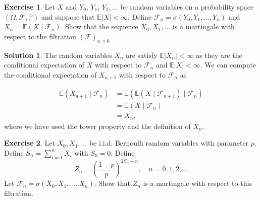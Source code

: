 \documentclass[12pt]{article}
\newcommand{\Prob}{\mathbb{P}}
\newcommand{\calF}{\mathcal{F}}
\newcommand{\abs}[1]{ \left| #1 \right| }
\newcommand{\Expect}{\mathbb{E}}
\theoremstyle{definition}
\newtheorem{exer}{Exercise}
\newtheorem{sol}{Solution}
\theoremstyle{remark}
\begin{document}
\begin{exer}
    Let $X$ and $Y_0$, $Y_1$, $Y_2, \ldots$ be random variables on a probability space $(\Omega, \calF, \Prob)$ and suppose that $\Expect\abs{X} < \infty$. Define $\calF_n = \sigma(Y_0, Y_1, \ldots, Y_n)$ and $X_n = \Expect(X\mid \calF_n)$. Show that the sequence $X_0, X_1, \ldots$ is a martingale with respect to the filtration $(\calF)_{n\geq 0}$
  \end{exer}

  \begin{sol}
      The random variables $X_n$ are satisfy $\Expect\abs{X_n} < \infty$ as they are the conditional expectation of $X$ with respect to $\calF_n$ and $\Expect\abs{X} < \infty$. We can compute the conditional expectation of $X_{n+1}$ with respect to $\calF_n$ as 

      \begin{align}
          \Expect(X_{n+1} \mid \calF_n) &= \Expect(\Expect(X \mid \calF_{n+1}) \mid \calF_n)\\
                                        &= \Expect(X\mid \calF_n) \\
                                        &= X_n,
      \end{align}
      where we have used the tower property and the definition of $X_n$.
  \end{sol}
  \newpage

\begin{exer}
    Let $X_0, X_1, \ldots$ be i.i.d. Bernoulli random variables with parameter $p$. Define $S_n = \sum_{i=1}^{n} X_i$ with $S_0 = 0$. Define 
    \begin{equation}
        Z_n = \left( \frac{1-p}{p} \right)^{2S_n - n}, \quad n = 0, 1, 2, \ldots
    \end{equation}
    Let $\calF_n = \sigma(X_0, X_1, \ldots, X_n)$. Show that $Z_n$ is a martingale with respect to this filtration.
\end{exer}
\end{document}
